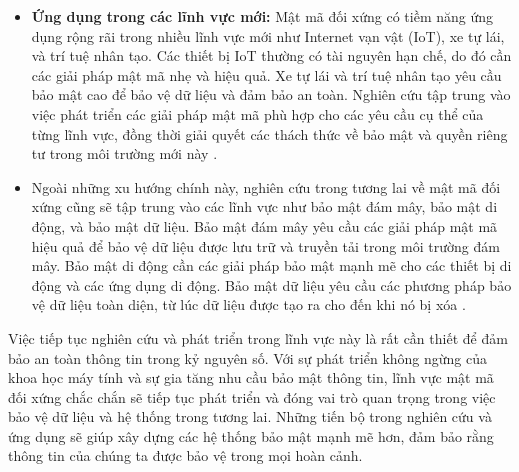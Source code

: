 \begin{itemize}
    \item \textbf{Ứng dụng trong các lĩnh vực mới:} Mật mã đối xứng có tiềm năng ứng dụng rộng rãi trong nhiều lĩnh vực mới như Internet vạn vật (IoT), xe tự lái, và trí tuệ nhân tạo. Các thiết bị IoT thường có tài nguyên hạn chế, do đó cần các giải pháp mật mã nhẹ và hiệu quả. Xe tự lái và trí tuệ nhân tạo yêu cầu bảo mật cao để bảo vệ dữ liệu và đảm bảo an toàn. Nghiên cứu tập trung vào việc phát triển các giải pháp mật mã phù hợp cho các yêu cầu cụ thể của từng lĩnh vực, đồng thời giải quyết các thách thức về bảo mật và quyền riêng tư trong môi trường mới này \cite{saberikamarposhti2024comprehensive}.
    \item Ngoài những xu hướng chính này, nghiên cứu trong tương lai về mật mã đối xứng cũng sẽ tập trung vào các lĩnh vực như bảo mật đám mây, bảo mật di động, và bảo mật dữ liệu. Bảo mật đám mây yêu cầu các giải pháp mật mã hiệu quả để bảo vệ dữ liệu được lưu trữ và truyền tải trong môi trường đám mây. Bảo mật di động cần các giải pháp bảo mật mạnh mẽ cho các thiết bị di động và các ứng dụng di động. Bảo mật dữ liệu yêu cầu các phương pháp bảo vệ dữ liệu toàn diện, từ lúc dữ liệu được tạo ra cho đến khi nó bị xóa \cite{saberikamarposhti2024comprehensive}.
\end{itemize}

Việc tiếp tục nghiên cứu và phát triển trong lĩnh vực này là rất cần thiết để đảm bảo an toàn thông tin trong kỷ nguyên số. Với sự phát triển không ngừng của khoa học máy tính và sự gia tăng nhu cầu bảo mật thông tin, lĩnh vực mật mã đối xứng chắc chắn sẽ tiếp tục phát triển và đóng vai trò quan trọng trong việc bảo vệ dữ liệu và hệ thống trong tương lai. Những tiến bộ trong nghiên cứu và ứng dụng sẽ giúp xây dựng các hệ thống bảo mật mạnh mẽ hơn, đảm bảo rằng thông tin của chúng ta được bảo vệ trong mọi hoàn cảnh.